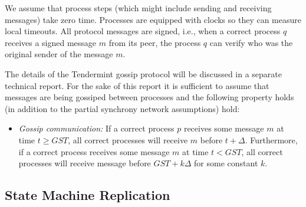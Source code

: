 We assume that process steps (which might include sending and receiving messages) take zero time.
Processes are equipped with clocks so they can measure local timeouts.
All protocol messages are signed, i.e., when a correct process $q$ receives a signed message $m$ from its peer, the process $q$ can verify who was the original sender of the message $m$.

The details of the Tendermint gossip protocol will be discussed in a separate technical report. For the sake of this report it is sufficient to assume that messages are being gossiped between processes and the following property holds (in addition to the partial synchrony network assumptions) hold:

\begin{itemize}
	\item \emph{Gossip communication:} If a correct process $p$ receives some message $m$ at time $t \ge GST$, all correct processes will receive $m$ before $t + \Delta$. Furthermore, if a correct process receives some message $m$ at time $t < GST$, all correct processes will receive message before $GST + k\Delta$ for some constant $k$.   
\end{itemize}




\subsection{State Machine Replication}

